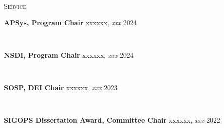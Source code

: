 \documentclass[10pt,times]{report}
\newlength{\sectiongap}
\newlength{\entrygap}
\newlength{\sectioncolwidth}
\newlength{\colgap}
\newlength{\stuffwidth}
\def\ifEqString#1#2{\def\testa{#1}\def\testb{#2}%
  \ifx\testa\testb}
\newenvironment{rtable}{
  \begin{minipage}{\textwidth}
  }{
  \end{minipage}
}
\newenvironment{rentry}[3][xxx]{
  \begin{minipage}[t]{\hsize}
    \textbf{#2}\ifEqString{#1}{xxx}\relax\else, \textit{#1}\fi
    \hspace{\stretch{1}} #3 \\
  }{
    \removelastskip
  \end{minipage}
  \\[\entrygap]  %
}
\newenvironment{rsection}[1]{
  \begin{minipage}[t]{\sectioncolwidth}
    \textsc{#1}
  \end{minipage}
  \hspace{\colgap}
  \begin{minipage}[t]{\stuffwidth}
  }{
    \removelastskip
  \end{minipage}
  \\[\sectiongap]
}
\begin{document}
\begin{rtable}
  \begin{rsection}{Service}
    \begin{rentry}{APSys, Program Chair}{2024}
      \vspace{-0.7em}
    \end{rentry}
    \begin{rentry}{NSDI, Program Chair}{2024}
      \vspace{-0.7em}
    \end{rentry}
    \begin{rentry}{SOSP, DEI Chair}{2023}
      \vspace{-0.7em}
    \end{rentry}
    \begin{rentry}{SIGOPS Dissertation Award, Committee Chair}{2022}

\end{rentry}
\end{rsection}
\end{rtable}
\end{document}
